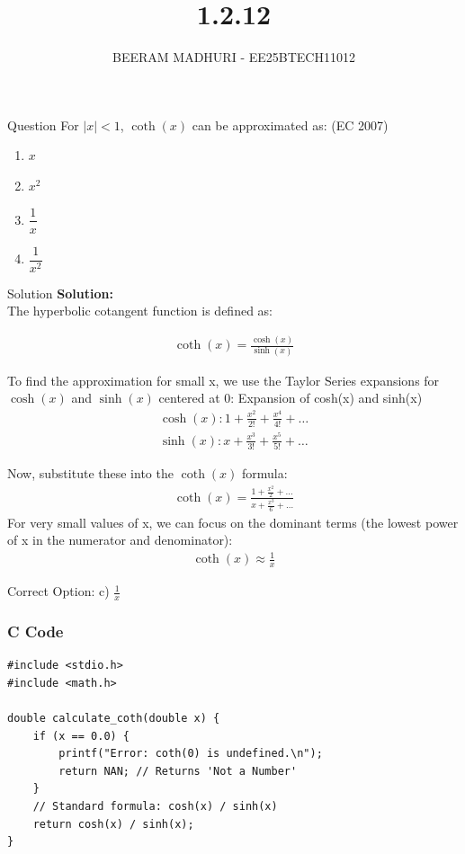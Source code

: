 \documentclass{beamer}
\title %
{1.2.12}
\author %
{BEERAM MADHURI - EE25BTECH11012}
\begin{document}
\frame{\titlepage}
\begin{frame}{Question}
For $|x| < 1$, $\coth(x)$ can be approximated as: \hfill (EC 2007)

\begin{enumerate}
    \item[a)] $x$
    \item[b)] $x^2$
    \item[c)] $\dfrac{1}{x}$
    \item[d)] $\dfrac{1}{x^2}$
\end{enumerate}

\end{frame}
\begin{frame}{Solution}
\textbf{Solution:}\\
The hyperbolic cotangent function is defined as:

\begin{align}
    \coth(x) = \frac{\cosh(x)}{\sinh(x)}
\end{align}

To find the approximation for small x, we use the Taylor Series expansions for $\cosh(x)$ and $\sinh(x)$ centered at 0:
Expansion of cosh(x) and sinh(x)
\begin{align}
    \cosh(x): 1 + \frac{x^2}{2!} + \frac{x^4}{4!} + \dots\\
    \sinh(x): x + \frac{x^3}{3!} + \frac{x^5}{5!} + \dots
\end{align}
\end{frame}
\begin{frame}
Now, substitute these into the $\coth(x)$ formula:
\begin{align}
    \coth(x) = \frac{1 + \frac{x^2}{2} + \dots}{x + \frac{x^3}{6} + \dots}
\end{align}
For very small values of x, we can focus on the dominant terms (the lowest power of x in the numerator and denominator):
\begin{align}
    \coth(x) \approx \frac{1}{x}
\end{align}

Correct Option: c) $\frac{1}{x}$
\end{frame}

\begin{frame}[fragile]
\frametitle{C Code}
\begin{lstlisting}
#include <stdio.h>
#include <math.h>

double calculate_coth(double x) {
    if (x == 0.0) {
        printf("Error: coth(0) is undefined.\n");
        return NAN; // Returns 'Not a Number'
    }
    // Standard formula: cosh(x) / sinh(x)
    return cosh(x) / sinh(x);
}
\end{lstlisting}
\end{frame}
\end{document}
